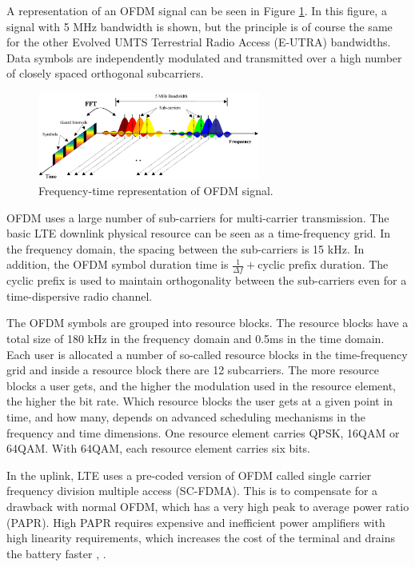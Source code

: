 A representation of an OFDM signal can be seen in Figure \ref{fig:ofdmfreq}. In
this figure, a signal with 5 MHz bandwidth is shown, but the principle is of
course the same for the other Evolved UMTS Terrestrial Radio Access (E-UTRA)
bandwidths. Data symbols are independently modulated and transmitted over a high
number of closely spaced orthogonal subcarriers.

\begin{figure}[htbp]
    \centering
    \includegraphics[width=0.65\textwidth]{./figures/ofdm_frequency}
    \caption{ Frequency-time representation of OFDM signal.
    \label{fig:ofdmfreq}}
\end{figure}

OFDM uses a large number of sub-carriers for multi-carrier transmission. The
basic LTE downlink physical resource can be seen as a time-frequency grid. In
the frequency domain, the spacing between the sub-carriers is 15 kHz. In
addition, the OFDM symbol duration time is $\frac{1}{\Delta f} + \text{cyclic
prefix duration}$. The cyclic prefix is used to maintain orthogonality between
the sub-carriers even for a time-dispersive radio channel.

The OFDM symbols are grouped into resource blocks. The resource blocks have a
total size of 180 kHz in the frequency domain and 0.5ms in the time domain. Each
user is allocated a number of so-called resource blocks in the time-frequency
grid and inside a resource block there are 12 subcarriers. The more resource
blocks a user gets, and the higher the modulation used in the resource element,
the higher the bit rate. Which resource blocks the user gets at a given point in
time, and how many, depends on advanced scheduling mechanisms in the frequency
and time dimensions. One resource element carries QPSK, 16QAM or 64QAM. With
64QAM, each resource element carries six bits.

In the uplink, LTE uses a pre-coded version of OFDM called single carrier
frequency division multiple access (SC-FDMA). This is to compensate for a
drawback with normal OFDM, which has a very high peak to average power ratio
(PAPR). High PAPR requires expensive and inefficient power amplifiers with high
linearity requirements, which increases the cost of the terminal and drains the
battery faster \cite{introlte}, \cite{umtslte}.

